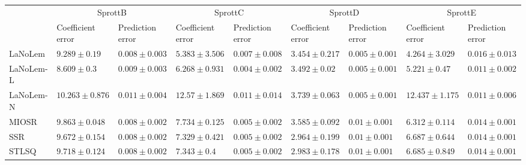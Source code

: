 \begin{table*}
{\begin{tabular}{lllllllll}
 & \multicolumn{2}{c}{SprottB} & \multicolumn{2}{c}{SprottC} & \multicolumn{2}{c}{SprottD} & \multicolumn{2}{c}{SprottE} \\
 & Coefficient error & Prediction error & Coefficient error & Prediction error & Coefficient error & Prediction error & Coefficient error & Prediction error \\
\midrule
LaNoLem & $9.289\pm 0.19$ & $\mathbf{0.008}\pm 0.003$ & $\mathbf{5.383}\pm 3.506$ & $0.007\pm 0.008$ & $3.454\pm 0.217$ & $0.005\pm 0.001$ & $\mathbf{4.264}\pm 3.029$ & $0.016\pm 0.013$ \\
LaNoLem-L & $\mathbf{8.609}\pm 0.3$ & $0.009\pm 0.003$ & $6.268\pm 0.931$ & $\mathbf{0.004}\pm 0.002$ & $3.492\pm 0.02$ & $0.005\pm 0.001$ & $5.221\pm 0.47$ & $0.011\pm 0.002$ \\
LaNoLem-N & $10.263\pm 0.876$ & $0.011\pm 0.004$ & $12.57\pm 1.869$ & $0.011\pm 0.014$ & $3.739\pm 0.063$ & $\mathbf{0.005}\pm 0.001$ & $12.437\pm 1.175$ & $\mathbf{0.011}\pm 0.006$ \\
MIOSR & $9.863\pm 0.048$ & $0.008\pm 0.002$ & $7.734\pm 0.125$ & $0.005\pm 0.002$ & $3.585\pm 0.092$ & $0.01\pm 0.001$ & $6.312\pm 0.114$ & $0.014\pm 0.001$ \\
SSR & $9.672\pm 0.154$ & $0.008\pm 0.002$ & $7.329\pm 0.421$ & $0.005\pm 0.002$ & $\mathbf{2.964}\pm 0.199$ & $0.01\pm 0.001$ & $6.687\pm 0.644$ & $0.014\pm 0.001$ \\
STLSQ & $9.718\pm 0.124$ & $0.008\pm 0.002$ & $7.343\pm 0.4$ & $0.005\pm 0.002$ & $2.983\pm 0.178$ & $0.01\pm 0.001$ & $6.685\pm 0.849$ & $0.014\pm 0.001$ \\

\midrule


\end{tabular}}
\end{table*}
